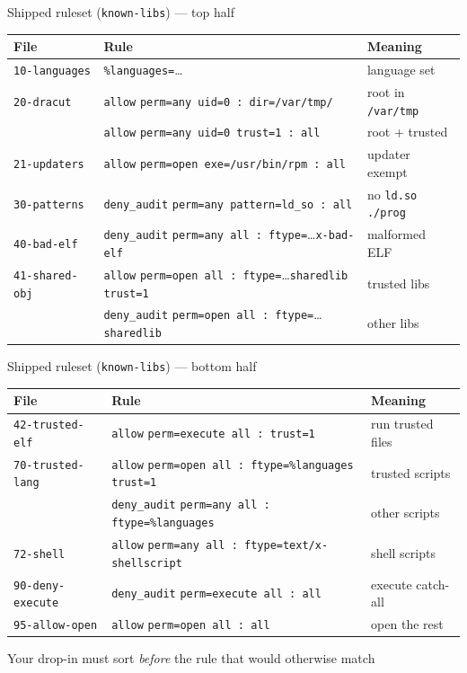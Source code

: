 \documentclass[aspectratio=169,11pt]{beamer}
\newcommand{\ok}[1]{\textcolor{allowc}{#1}}
\newcommand{\no}[1]{\textcolor{denyc}{#1}}
\begin{document}
\begin{frame}{Shipped ruleset (\texttt{known-libs}) --- top half}
  \footnotesize
  \begin{tabular}{@{}l>{\raggedright\arraybackslash}p{8.3cm}>{\raggedright\arraybackslash}p{2.3cm}@{}}
    \toprule
    File & Rule & Meaning \\
    \midrule
    \texttt{10-languages} & \texttt{\%languages=}\ldots & language set \\
    \texttt{20-dracut} & \ok{\texttt{allow}} \texttt{perm=any uid=0 : dir=/var/tmp/} & root in \texttt{/var/tmp} \\
     & \ok{\texttt{allow}} \texttt{perm=any uid=0 trust=1 : all} & root + trusted \\
    \texttt{21-updaters} & \ok{\texttt{allow}} \texttt{perm=open exe=/usr/bin/rpm : all} & updater exempt \\
    \texttt{30-patterns} & \no{\texttt{deny\_audit}} \texttt{perm=any pattern=ld\_so : all} & no \texttt{ld.so ./prog} \\
    \texttt{40-bad-elf} & \no{\texttt{deny\_audit}} \texttt{perm=any all : ftype=}\ldots\texttt{x-bad-elf} & malformed ELF \\
    \texttt{41-shared-obj} & \ok{\texttt{allow}} \texttt{perm=open all : ftype=}\ldots\texttt{sharedlib trust=1} & trusted libs \\
     & \no{\texttt{deny\_audit}} \texttt{perm=open all : ftype=}\ldots\texttt{sharedlib} & other libs \\
    \bottomrule
  \end{tabular}
\end{frame}

\begin{frame}{Shipped ruleset (\texttt{known-libs}) --- bottom half}
  \footnotesize
  \begin{tabular}{@{}l>{\raggedright\arraybackslash}p{8.3cm}>{\raggedright\arraybackslash}p{2.3cm}@{}}
    \toprule
    File & Rule & Meaning \\
    \midrule
    \texttt{42-trusted-elf} & \ok{\texttt{allow}} \texttt{perm=execute all : trust=1} & run trusted files \\
    \texttt{70-trusted-lang} & \ok{\texttt{allow}} \texttt{perm=open all : ftype=\%languages trust=1} & trusted scripts \\
     & \no{\texttt{deny\_audit}} \texttt{perm=any all : ftype=\%languages} & other scripts \\
    \texttt{72-shell} & \ok{\texttt{allow}} \texttt{perm=any all : ftype=text/x-shellscript} & shell scripts \\
    \texttt{90-deny-execute} & \no{\texttt{deny\_audit}} \texttt{perm=execute all : all} & execute catch-all \\
    \texttt{95-allow-open} & \ok{\texttt{allow}} \texttt{perm=open all : all} & open the rest \\
    \bottomrule
  \end{tabular}

  \vspace{0.6em}
  Your drop-in must sort \emph{before} the rule that would otherwise match
\end{frame}
\end{document}
